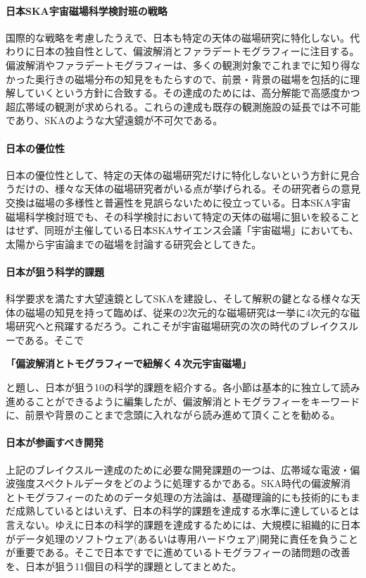 \paragraph{日本SKA宇宙磁場科学検討班の戦略}

国際的な戦略を考慮したうえで、日本も特定の天体の磁場研究に特化しない。代わりに日本の独自性として、偏波解消とファラデートモグラフィーに注目する。偏波解消やファラデートモグラフィーは、多くの観測対象でこれまでに知り得なかった奥行きの磁場分布の知見をもたらすので、前景・背景の磁場を包括的に理解していくという方針に合致する。その達成のためには、高分解能で高感度かつ超広帯域の観測が求められる。これらの達成も既存の観測施設の延長では不可能であり、SKAのような大望遠鏡が不可欠である。

\paragraph{日本の優位性}

日本の優位性として、特定の天体の磁場研究だけに特化しないという方針に見合うだけの、様々な天体の磁場研究者がいる点が挙げられる。その研究者らの意見交換は磁場の多様性と普遍性を見誤らないために役立っている。日本SKA宇宙磁場科学検討班でも、その科学検討において特定の天体の磁場に狙いを絞ることはせず、同班が主催している日本SKAサイエンス会議「宇宙磁場」においても、太陽から宇宙論までの磁場を討論する研究会としてきた。

\paragraph{日本が狙う科学的課題}

科学要求を満たす大望遠鏡としてSKAを建設し、そして解釈の鍵となる様々な天体の磁場の知見を持って臨めば、従来の2次元的な磁場研究は一挙に4次元的な磁場研究へと飛躍するだろう。これこそが宇宙磁場研究の次の時代のブレイクスルーである。そこで
\begin{center}
{\bf \Large 「偏波解消とトモグラフィーで紐解く４次元宇宙磁場」}
\end{center}
と題し、日本が狙う10の科学的課題を紹介する。各小節は基本的に独立して読み進めることができるように編集したが、偏波解消とトモグラフィーをキーワードに、前景や背景のことまで念頭に入れながら読み進めて頂くことを勧める。

\paragraph{日本が参画すべき開発}

上記のブレイクスルー達成のために必要な開発課題の一つは、広帯域な電波・偏波強度スペクトルデータをどのように処理するかである。SKA時代の偏波解消とトモグラフィーのためのデータ処理の方法論は、基礎理論的にも技術的にもまだ成熟しているとはいえず、日本の科学的課題を達成する水準に達しているとは言えない。ゆえに日本の科学的課題を達成するためには、大規模に組織的に日本がデータ処理のソフトウェア(あるいは専用ハードウェア)開発に責任を負うことが重要である。そこで日本ですでに進めているトモグラフィーの諸問題の改善を、日本が狙う11個目の科学的課題としてまとめた。

